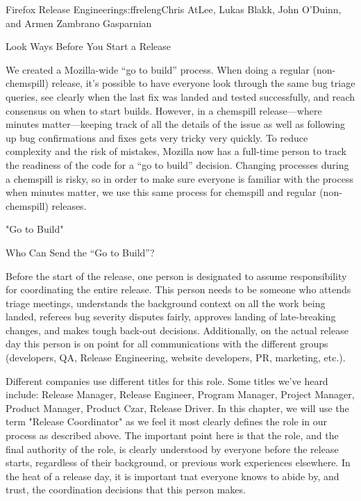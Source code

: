 \begin{aosachapter}{Firefox Release Engineering}{s:ffreleng}{Chris AtLee, Lukas Blakk, John O'Duinn, and Armen Zambrano Gasparnian}
\begin{aosasect1}{Look  Ways Before You Start a Release}
\begin{aosaenumerate}
\item We created a Mozilla-wide ``go to build'' process. When doing a
  regular (non-chemspill) release, it's possible to have everyone look
  through the same bug triage queries, see clearly when
  the last fix was landed and tested successfully, and reach consensus on
  when to start builds. However, in a chemspill release---where
  minutes matter---keeping track of all the details of the issue as well as
  following up bug confirmations and fixes gets very tricky very
  quickly.  To reduce complexity and the risk of mistakes, Mozilla
  now has a full-time person 
  to track the readiness of the code for a ``go to build''
  decision. Changing processes
  during a chemspill is risky, so in order to make sure everyone
  is familiar with the process when minutes matter, we use this
  same process for chemspill and regular (non-chemspill)
  releases.

\end{aosaenumerate}


\end{aosasect1}

\begin{aosasect1}{"Go to Build"}

\begin{aosasect2}{Who Can Send the ``Go to Build''?}

Before the start of the release, one person is designated to assume
responsibility for coordinating the entire release. This person needs to be
someone who attends triage meetings, understands the
background context on all the work being landed, referees bug severity
disputes fairly, approves landing of late-breaking changes, and makes
tough back-out decisions.  Additionally, on the actual release day
this person is on point for all communications with the different
groups (developers, QA, Release Engineering, website developers, PR,
marketing, etc.).

Different companies use different titles for this role. Some titles we've heard 
include: Release Manager, Release Engineer, Program Manager, Project Manager, Product Manager, Product Czar, Release
Driver. In this chapter, we will use the term "Release Coordinator" 
as we feel it most clearly defines the role in our process as described above. 
The important point here is that the role, and the final authority of the role, is
clearly understood by everyone before the release starts, regardless 
of their background, or previous work experiences elsewhere. In the 
heat of a release day, it is important tnat everyone knows to abide by, and trust, 
the coordination decisions that this person makes. 


\end{aosasect2}
\end{aosasect1}
\end{aosachapter}
